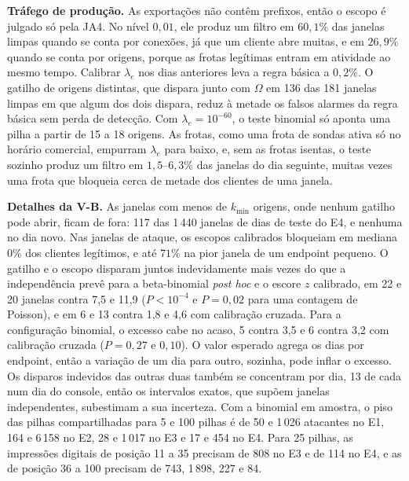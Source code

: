 \documentclass[conference,letterpaper,10pt]{IEEEtran}
\newcommand\1{\textit{(i)}}
\newcommand\2{\textit{(ii)}}
\newcommand\3{\textit{(iii)}}
\begin{document}
\textbf{Tráfego de produção.} As exportações não contêm prefixos, então o escopo é julgado só pela JA4. No nível $0{,}01$, ele produz um filtro em $60{,}1\%$ das janelas limpas quando se conta por conexões, já que um cliente abre muitas, e em $26{,}9\%$ quando se conta por origens, porque as frotas legítimas entram em atividade ao mesmo tempo. Calibrar $\lambda_e$ nos dias anteriores leva a regra básica a $0{,}2\%$. O gatilho de origens distintas, que dispara junto com $\Omega$ em 136 das 181 janelas limpas em que algum dos dois dispara, reduz à metade os falsos alarmes da regra básica sem perda de detecção. Com $\lambda_e = 10^{-60}$, o teste binomial só aponta uma pilha a partir de 15 a 18 origens. As frotas, como uma frota de sondas ativa só no horário comercial, empurram $\lambda_e$ para baixo, e, sem as frotas isentas, o teste sozinho produz um filtro em $1{,}5$--$6{,}3\%$ das janelas do dia seguinte, muitas vezes uma frota que bloqueia cerca de metade dos clientes de uma janela.

\textbf{Detalhes da V-B.} As janelas com menos de $k_{\min}$ origens, onde nenhum gatilho pode abrir, ficam de fora: 117 das 1\,440 janelas de dias de teste do E4, e nenhuma no dia novo. Nas janelas de ataque, os escopos calibrados bloqueiam em mediana $0\%$ dos clientes legítimos, e até $71\%$ na pior janela de um endpoint pequeno. O gatilho e o escopo disparam juntos indevidamente mais vezes do que a independência prevê para a beta-binomial \textit{post hoc} e o escore $z$ calibrado, em 22 e 20 janelas contra 7,5 e 11,9 ($P < 10^{-4}$ e $P = 0{,}02$ para uma contagem de Poisson), e em 6 e 13 contra 1,8 e 4,6 com calibração cruzada. Para a configuração binomial, o excesso cabe no acaso, 5 contra 3,5 e 6 contra 3,2 com calibração cruzada ($P = 0{,}27$ e $0{,}10$). O valor esperado agrega os dias por endpoint, então a variação de um dia para outro, sozinha, pode inflar o excesso. Os disparos indevidos das outras duas também se concentram por dia, 13 de cada num dia do console, então os intervalos exatos, que supõem janelas independentes, subestimam a sua incerteza. Com a binomial em amostra, o piso das pilhas compartilhadas para 5 e 100 pilhas é de 50 e 1\,026 atacantes no E1, 164 e 6\,158 no E2, 28 e 1\,017 no E3 e 17 e 454 no E4. Para 25 pilhas, as impressões digitais de posição 11 a 35 precisam de 808 no E3 e de 114 no E4, e as de posição 36 a 100 precisam de 743, 1\,898, 227 e 84.
\end{document}
